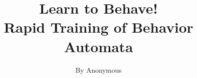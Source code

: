 \documentclass{aamas2010_cameraReady}
\begin{document}





\title{Learn to Behave!\\Rapid Training of Behavior Automata}

\sloppy




\author{
\alignauthor
By Anonymous\\
       \affaddr{~}\\
       \affaddr{ ~}\\
       \affaddr{~ }\\
       \affaddr{~ }\\
       \email{ ~}\\
}
\end{document}
